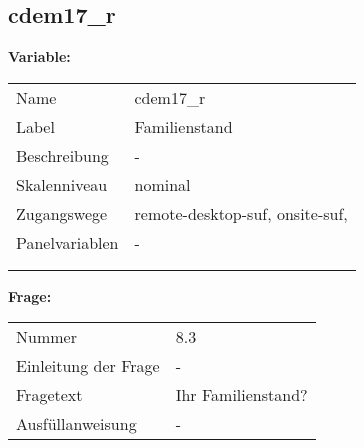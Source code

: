 	
	
	\subsection{cdem17\_r}
	\label{subSection:cdem17_r}

	\noindent\textbf{Variable:}\\
		\begin{tabular}{lL{11.3cm}}
			\label{tableVariable:cdem17_r}
			Name & cdem17\_r \\
			Label & Familienstand \\
			Beschreibung & - \\
			Skalenniveau & nominal \\
			Zugangswege &
				remote-desktop-suf,
				onsite-suf,
 \\
			Panelvariablen & -
			 \\
			 \\
 \\
		\end{tabular}

		\vspace*{1 cm}
		\noindent\textbf{Frage:}\\
		\begin{tabular}{lL{11.3cm}}
			\label{tableQuestion:cdem17_r}
			Nummer & 8.3 \\
			Einleitung der Frage & - \\
			Fragetext & Ihr Familienstand? \\
			Ausfüllanweisung & - \\
		\end{tabular}





